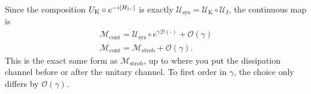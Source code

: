 Since the composition ${U}_{\text{K}} \circ e^{-i[H_{\text{I}},\cdot]}$ is exactly $\mathcal{U}_{\text{sys}}=\mathcal{U}_{\text{K}}\circ \mathcal{U}_{I}$, the continuous map is 
\begin{align}
    \mathcal{M}_{\text{cont}}=\mathcal{U}_{\text{sys}} \circ e^{\gamma \mathcal{D}(\cdot)} + \mathcal{O}(\gamma) \nonumber\\
    \mathcal{M}_{\text{cont}}=\mathcal{M}_{\text{strob}} + \mathcal{O}(\gamma).
\end{align}
This is the exact same form as $\mathcal{M}_{\text{strob}}$, up to where you put the dissipation channel before or after the unitary channel. To first order in $\gamma$, the choice only differs by $\mathcal{O}(\gamma)$.